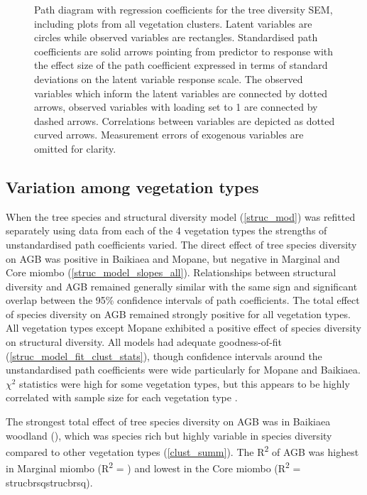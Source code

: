 \documentclass[11pt,a4paper]{article}
\begin{document}
\begin{figure}[H]
\centering
	
	\caption{Path diagram with regression coefficients for the tree diversity SEM, including plots from all vegetation clusters. Latent variables are circles while observed variables are rectangles. Standardised path coefficients are solid arrows pointing from predictor to response with the effect size of the path coefficient expressed in terms of standard deviations on the latent variable response scale. The observed variables which inform the latent variables are connected by dotted arrows, observed variables with loading set to 1 are connected by dashed arrows. Correlations between variables are depicted as dotted curved arrows. Measurement errors of exogenous variables are omitted for clarity.}
	\label{struc_mod}
\end{figure}

\subsection*{Variation among vegetation types}

When the tree species and structural diversity model (\autoref{struc_mod}) was refitted separately using data from each of the 4 vegetation types the strengths of unstandardised path coefficients varied.  The direct effect of tree species diversity on AGB was positive in Baikiaea and Mopane, but negative in Marginal and Core miombo (\autoref{struc_model_slopes_all}). Relationships between structural diversity and AGB remained generally similar with the same sign and significant overlap between the 95\% confidence intervals of path coefficients. The total effect of species diversity on AGB remained strongly positive for all vegetation types. All vegetation types except Mopane exhibited a positive effect of species diversity on structural diversity. All models had adequate goodness-of-fit (\autoref{struc_model_fit_clust_stats}), though confidence intervals around the unstandardised path coefficients were wide particularly for Mopane and Baikiaea. $\chi^{2}$ statistics were high for some vegetation types, but this appears to be highly correlated with sample size for each vegetation type \citep{Hooper2008}.

The strongest total effect of tree species diversity on AGB was in Baikiaea woodland (\struccsb{}), which was species rich but highly variable in species diversity compared to other vegetation types (\autoref{clust_summ}). The R\textsuperscript{2} of AGB was highest in Marginal miombo (R\textsuperscript{2} = \strucarsq{}) and lowest in the Core miombo (R\textsuperscript{2} = \\strucbrsq{}strucbrsq{}).
\end{document}
